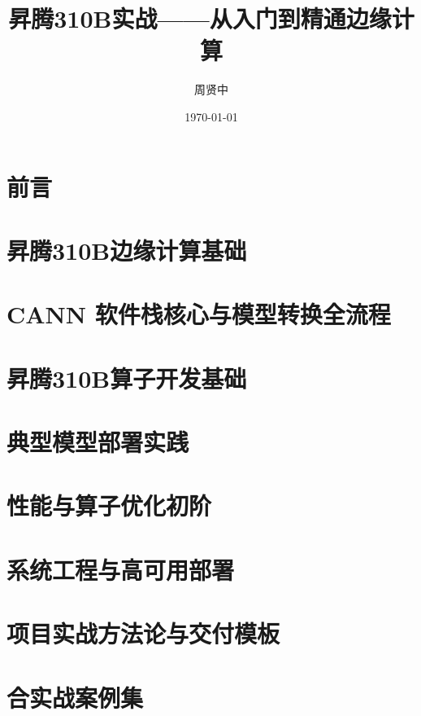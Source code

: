 \documentclass[fontsize=12pt, paper=a4, twoside, openright, DIV=calc]{scrbook}
\title{昇腾310B实战——从入门到精通边缘计算}
\author{周贤中}
\date{\today}
\theoremstyle{break}
\begin{document}
\maketitle

\frontmatter
\chapter*{前言}



\tableofcontents

\mainmatter


\chapter{昇腾310B边缘计算基础}


\chapter{CANN 软件栈核心与模型转换全流程}
% 

\chapter{昇腾310B算子开发基础}
% 

\chapter{典型模型部署实践}
% 

\chapter{性能与算子优化初阶}
% 

\chapter{系统工程与高可用部署}
% 

\chapter{项目实战方法论与交付模板}
% 

\chapter{合实战案例集}
% 
\end{document}
